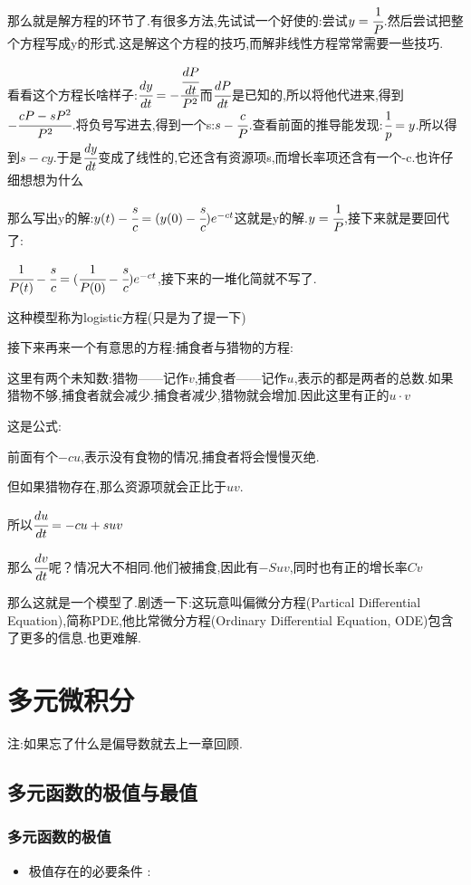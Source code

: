 \documentclass[UTF8,12pt]{ctexbook}
\begin{document}
{{{{  那么就是解方程的环节了.有很多方法,先试试一个好使的:尝试$y = \cfrac{1}{P}$.然后尝试把整个方程写成y的形式.这是解这个方程的技巧,而解非线性方程常常需要一些技巧.

  看看这个方程长啥样子:$\cfrac{dy}{dt} = -\cfrac{\cfrac{dP}{dt}}{P^2}$而$\cfrac{dP}{dt}$是已知的,所以将他代进来,得到$-\cfrac{cP - sP^2}{P^2}$.将负号写进去,得到一个s:$s - \cfrac{c}{P}$.查看前面的推导能发现:$\cfrac{1}{p} = y$.所以得到$s - cy$.于是$\cfrac{dy}{dt}$变成了线性的,它还含有资源项s,而增长率项还含有一个-c.也许仔细想想为什么

  那么写出y的解:$y(t) - \cfrac{s}{c} = (y(0) - \cfrac{s}{c})e^{-ct}$这就是y的解.$y = \cfrac{1}{P}$,接下来就是要回代了:

  $\cfrac{1}{P(t)} - \cfrac{s}{c} = (\cfrac{1}{P(0)} - \cfrac{s}{c})e^{-ct}$,接下来的一堆化简就不写了.

  这种模型称为logistic方程(只是为了提一下)

  接下来再来一个有意思的方程:捕食者与猎物的方程:

  这里有两个未知数:猎物——记作$v$,捕食者——记作$u$,表示的都是两者的总数.如果猎物不够,捕食者就会减少.捕食者减少,猎物就会增加.因此这里有正的$u \cdot v$

  这是公式:

  前面有个$-cu$,表示没有食物的情况,捕食者将会慢慢灭绝.

  但如果猎物存在,那么资源项就会正比于$uv$.

  所以$\cfrac{du}{dt} = -cu + suv$

  那么$\cfrac{dv}{dt}$呢？情况大不相同.他们被捕食,因此有$-Suv$,同时也有正的增长率$Cv$

  那么这就是一个模型了.剧透一下:这玩意叫偏微分方程(Partical Differential Equation),简称PDE,他比常微分方程(Ordinary Differential Equation, ODE)包含了更多的信息.也更难解.

}%

}%

}%

\section{多元微积分}{
注:如果忘了什么是偏导数就去上一章回顾.

\subsection{多元函数的极值与最值}{

  \subsubsection{多元函数的极值}{
    \begin{itemize}
      \item {
            极值存在的必要条件 :

}
\end{itemize}}}}}
\end{document}
